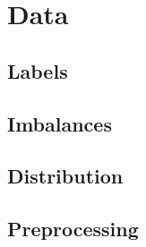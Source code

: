 \section{Data}

\subsection{Labels}

\subsection{Imbalances}

\subsection{Distribution}

\subsection{Preprocessing}